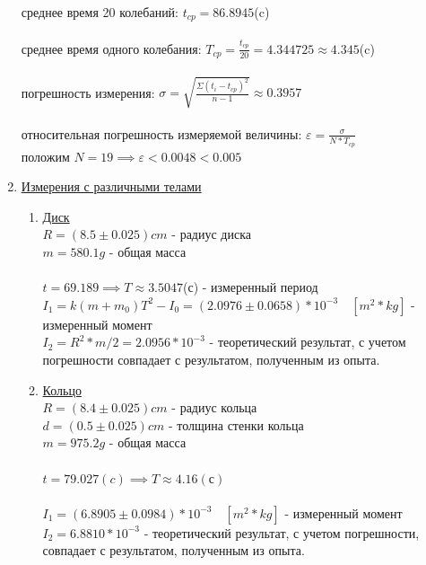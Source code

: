 \documentclass[12pt]{article}
\begin{document}
\begin{enumerate}
            среднее время 20 колебаний: $t_{cp} = 86.8945$(c) \\ \\
            среднее время одного колебания: $T_{cp} = \frac{t_{cp}}{20} = 4.344725 \approx 4.345$(c) \\ \\ 
            погрешность измерения: $\sigma = \sqrt{\frac{\Sigma (t_i - t_{cp})^2 }{n-1}} \approx 0.3957$ \\ \\
            относительная погрешность измеряемой величины: $\varepsilon = \frac{\sigma}{N* T_{cp}}$ \\ 
            положим $N = 19 \implies \varepsilon < 0.0048 < 0.005$ \\ 
        \item \underline{Измерения с различными телами}
            \begin{enumerate} 
                \item \underline{Диск} \\
                    $R = (8.5 \pm 0.025)cm$  - радиус диска \\ 
                    $m = 580.1 g$ - общая масса\\ \\
                    $t = 69.189 \implies T \approx 3.5047$(с) - измеренный период \\
                     
                    $I_1 = k(m + m_0)T^2 - I_0 = (2.0976 \pm 0.0658) * 10 ^ {-3} \quad [m^2 * kg]$ - измеренный момент \\
                    $I_2 = R^2 * m/ 2 = 2.0956 * 10^{-3}$ - теоретический результат, с учетом погрешности совпадает с результатом, полученным из опыта.
                    

                \item \underline{Кольцо} \\
                    $R = (8.4 \pm 0.025)cm$  - радиус кольца \\ 
                    $d = (0.5 \pm 0.025)cm$ - толщина стенки кольца  \\
                    $m = 975.2 g$ - общая масса\\ \\
                    $t = 79.027(c) \implies T \approx 4.16(с)$ \\ \\ 
                    $I_1 = (6.8905 \pm 0.0984) * 10^{-3} \quad [m^2 * kg]$ - измеренный момент
                    $I_2 = 6.8810 * 10 ^ {-3}$ - теоретический результат, с учетом погрешности, совпадает с результатом, полученным из опыта.


\end{enumerate}
\end{enumerate}
\end{document}
